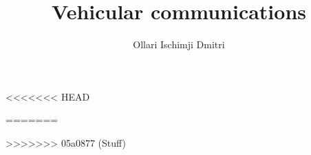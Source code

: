 \documentclass[12pt]{article}
\begin{document}
\title{
	Vehicular communications
}
\author{Ollari Ischimji Dmitri}

\maketitle

\hypersetup{
    linkcolor=black,  %
    filecolor=black,  %
    urlcolor=black,   %
    citecolor=black   %
}

\newpage

\tableofcontents

% 
% 
<<<<<<< HEAD

% 



=======
% 
% 


>>>>>>> 05a0877 (Stuff)
\end{document}
